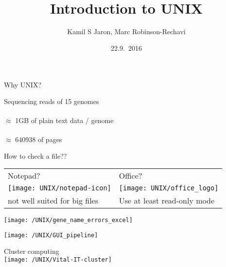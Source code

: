\documentclass[xcolor=dvipsnames]{beamer}
\title[ ]{Introduction to UNIX}
\author{Kamil S Jaron, Marc Robinson-Rechavi}
\date{22.9.~2016}
\begin{document}
\Large
\begin{frame}
	\titlepage
\end{frame}

\begin{frame}
	\Huge
	\begin{center}
		Why UNIX?	
	\end{center}
\end{frame}

\begin{frame}
	\huge
	\begin{center}
	Sequencing reads of 15 genomes \\
	~\\
	$\approx$ 1GB of plain text data / genome \\
	~\\
	$\approx$ 640938 of pages
	\end{center}
\end{frame}

\begin{frame}
	\begin{center}
	\huge
	How to check a file?? \\
	\vspace{1cm}
	
	\Large
	\begin{tabular}{C{0.4\textwidth}C{0.4\textwidth}}
	Notepad? & Office? \\
	\texttt{[image: UNIX/notepad-icon]} & \texttt{[image: UNIX/office\_logo]} \\
	\small not well suited for big files & \small Use at least read-only mode\\
	\end{tabular}
	\end{center}
\end{frame}

\begin{frame}
	\begin{center}
		\texttt{[image: /UNIX/gene\_name\_errors\_excel]}
	\end{center}
\end{frame}


\begin{frame}
	\begin{center}
		\texttt{[image: /UNIX/GUI\_pipeline]}
	\end{center}
\end{frame}


\begin{frame}
	\begin{center}
		\Huge
		Cluster computing\\
		\vspace{1cm}
		\texttt{[image: /UNIX/Vital-IT-cluster]}
	\end{center}
\end{frame}	
\end{document}
